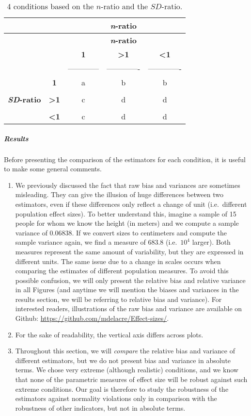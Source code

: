 \documentclass[
  12pt,
  french,
]{article}
\begin{document}
\begin{longtable}[]{@{}ccccc@{}}
\caption{4 conditions based on the \(n\)-ratio and the
\(SD\)-ratio.}\tabularnewline
\toprule
& & & \textbf{\emph{n}-ratio} & \\
\midrule
\endfirsthead
\toprule
& & & \textbf{\emph{n}-ratio} & \\
\midrule
\endhead
& & \textbf{1} & \textbf{\textgreater1} & \textbf{\textless1} \\
& & ------------ & ------------- & ------------- \\
& \textbf{1} & a & b & b \\
& & & & \\
\textbf{\emph{SD}-ratio} & \textbf{\textgreater1} & c & d & d \\
& & & & \\
& \textbf{\textless1} & c & d & d \\
\bottomrule
\end{longtable}

\hypertarget{results}{%
\subparagraph{Results}\label{results}}

Before presenting the comparison of the estimators for each condition,
it is useful to make some general comments.

\begin{enumerate}
\def\labelenumi{\arabic{enumi})}
\item
  We previously discussed the fact that raw bias and variances are
  sometimes misleading. They can give the illusion of huge differences
  between two estimators, even if these differences only reflect a
  change of unit (i.e.~different population effect sizes). To better
  understand this, imagine a sample of 15 people for whom we know the
  height (in meters) and we compute a sample variance of 0.06838. If we
  convert sizes to centimeters and compute the sample variance again, we
  find a measure of 683.8 (i.e.~\(10^4\) larger). Both measures
  represent the same amount of variability, but they are expressed in
  different units. The same issue due to a change in scales occurs when
  comparing the estimates of different population measures. To avoid
  this possible confusion, we will only present the relative bias and
  relative variance in all Figures (and anytime we will mention the
  biases and variances in the results section, we will be referring to
  relative bias and variance). For interested readers, illustrations of
  the raw bias and variance are available on Github:
  \url{https://github.com/mdelacre/Effect-sizes/}.
\item
  For the sake of readability, the vertical axis differs across plots.
\item
  Throughout this section, we will \emph{compare} the relative bias and
  variance of different estimators, but we do not present bias and
  variance in absolute terms. We chose very extreme (although realistic)
  conditions, and we know that none of the parametric measures of effect
  size will be robust against such extreme conditions. Our goal is
  therefore to study the robustness of the estimators against normality
  violations only in comparison with the robustness of other indicators,
  but not in absolute terms.
\end{enumerate}
\end{document}
